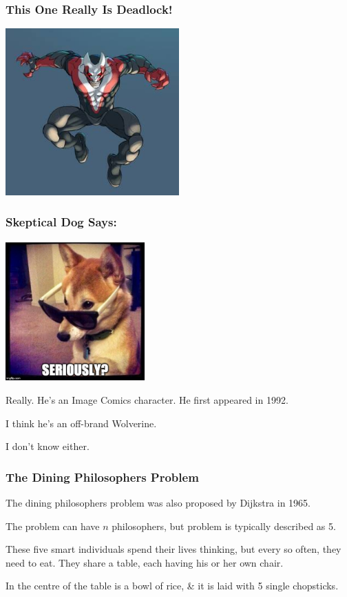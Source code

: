 \begin{frame}
\frametitle{This One Really Is Deadlock!}

\begin{center}
	\includegraphics[width=0.5\textwidth]{images/deadlock.jpg}
\end{center}

\end{frame}

\begin{frame}
\frametitle{Skeptical Dog Says:}

\begin{center}
	\includegraphics[width=0.4\textwidth]{images/skeptical-dog.jpg}
\end{center}

Really. He's an Image Comics character. He first appeared in 1992.

I think he's an off-brand Wolverine.

I don't know either.


\end{frame}



\begin{frame}
\frametitle{The Dining Philosophers Problem}

The dining philosophers problem was also proposed by Dijkstra in 1965. 

The problem can have $n$ philosophers, but problem is typically described as 5. 

 These five smart individuals spend their lives thinking, but every so often, they need to eat. They share a table, each having his or her own chair. 
 
In the centre of the table is a bowl of rice, \& it is laid with 5 single chopsticks. 

\end{frame}

